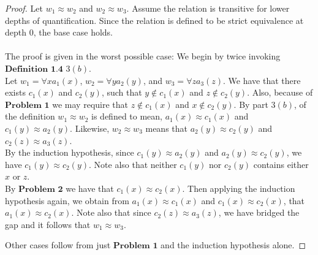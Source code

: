 \documentclass{article}
\theoremstyle{problemstyle}
\theoremstyle{lemmastyle}
\theoremstyle{theoremstyle}
\begin{document}
\begin{proof}
Let $w_1 \approx w_2$ and $w_2 \approx w_3$. Assume the relation is transitive for lower depths of quantification. Since the relation is defined to be strict equivalence at depth $0$, the base case holds.\\\\ The proof is given in the worst possible case: We begin by twice invoking $\textbf{Definition 1.4}$ $3 (b)$. \\

Let $w_1 = \forall x a_1(x)$, $w_2 = \forall y a_2(y)$, and $w_3 = \forall z a_3(z)$. We have that there exists $c_1(x)$ and $c_2(y)$, such that $y \notin c_1(x)$ and $z \notin c_2(y)$. Also, because of $\textbf{Problem 1}$ we may require that $z \notin c_1(x)$ and $x \notin c_2(y)$.  By part $3 (b)$, of the definition $w_1 \approx w_2$ is defined to mean, $a_1(x) \approx c_1(x)$ and $c_1(y) \approx a_2(y)$. Likewise, $w_2 \approx w_3$ means that $a_2(y) \approx c_2(y)$ and $c_2(z) \approx a_3(z)$.\\

By the induction hypothesis, since $c_1(y) \approx a_2(y)$ and $a_2(y) \approx c_2(y)$, we have $c_1(y) \approx c_2(y)$. Note also that neither $c_1(y)$ nor $c_2(y)$ contains either $x$ or $z$.\\

By $\textbf{Problem 2}$ we have that  $c_1(x) \approx c_2(x)$. Then applying the induction hypothesis again, we obtain from $a_1(x) \approx c_1(x)$ and $c_1(x) \approx c_2(x)$, that $a_1(x) \approx c_2(x)$. Note also that since $c_2(z) \approx a_3(z)$, we have bridged the gap and it follows that $w_1 \approx w_3$.

Other cases follow from just $\textbf{Problem 1}$ and the induction hypothesis alone. 

\end{proof}
\end{document}
